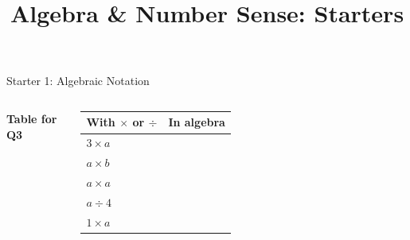 \documentclass{beamer}
\title{Algebra \& Number Sense: Starters}
\author{}
\date{}
\newcommand{\ablank}[1]{%
  \alt<2>{\textcolor{red}{#1}}{\underline{\phantom{#1}}}%
}
\newcommand{\dheading}[1]{{\scriptsize\bfseries #1}\par\vspace{0.2em}}
\newcommand{\tblank}[1]{\ablank{\makebox[1.6em]{#1}}}
\newcommand{\tgiven}[1]{\makebox[1.6em]{#1}}
\begin{document}
\frame{\titlepage}

\begin{frame}[t]{Starter 1: Algebraic Notation}
\begin{columns}[T,onlytextwidth]

\vspace{-0.4em}
\dheading{Table for Q3}
{\footnotesize
\renewcommand{\arraystretch}{1.25}
\begin{tabular}{@{}l|l@{}}
  With $\times$ or $\div$ & In algebra\\ \hline
  $3\times a$ & \tgiven{$3a$}\\
  $a\times b$ & \tblank{$ab$}\\
  $a\times a$ & \tblank{$a^2$}\\
  $a\div4$    & \tblank{$\dfrac{a}{4}$}\\[2pt]
  $1\times a$ & \tblank{$a$}
\end{tabular}}


\end{columns}
\end{frame}
\end{document}
